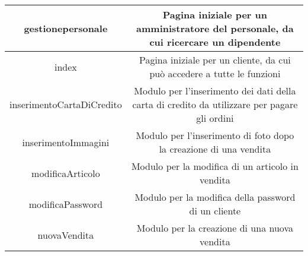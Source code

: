 \documentclass[12pt,a4paper]{article}
\begin{document}
\begin{center}
\begin{tabular}{|c|c|}
gestionepersonale & \begin{minipage}{10cm} \vspace{5pt}
Pagina iniziale per un amministratore del personale, da cui ricercare un dipendente \vspace{5pt}
\end{minipage} \\ \hline

index & \begin{minipage}{10cm} \vspace{5pt}
Pagina iniziale per un cliente, da cui può accedere a tutte le funzioni \vspace{5pt}
\end{minipage} \\ \hline

inserimentoCartaDiCredito & \begin{minipage}{10cm} \vspace{5pt}
Modulo per l'inserimento dei dati della carta di credito da utilizzare per pagare gli ordini \vspace{5pt}
\end{minipage} \\ \hline

inserimentoImmagini & \begin{minipage}{10cm} \vspace{5pt}
Modulo per l'inserimento di foto dopo la creazione di una vendita \vspace{5pt}
\end{minipage} \\ \hline

modificaArticolo & \begin{minipage}{10cm} \vspace{5pt}
Modulo per la modifica di un articolo in vendita \vspace{5pt}
\end{minipage} \\ \hline

modificaPassword & \begin{minipage}{10cm} \vspace{5pt}
Modulo per la modifica della password di un cliente \vspace{5pt}
\end{minipage} \\ \hline

nuovaVendita & \begin{minipage}{10cm} \vspace{5pt}
Modulo per la creazione di una nuova vendita \vspace{5pt}
\end{minipage} \\ \hline


\end{tabular}
\end{center}
\end{document}
